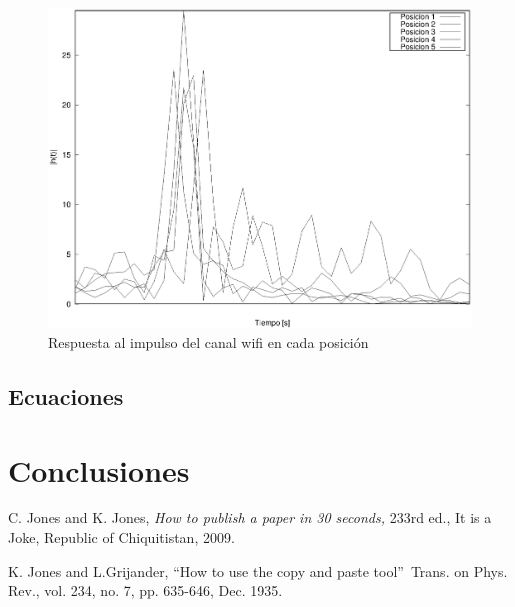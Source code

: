 \documentclass[10pt,conference,a4paper]{IEEEtran}
\begin{document}
\begin{figure}[htb]
    \centering
    \includegraphics[width=\columnwidth]{figuras/respuesta_impulso_wifi.eps}
    \caption{Respuesta al impulso del canal wifi en cada posición}
    \label{fig:impulso_wifi}
\end{figure}
\subsection{Ecuaciones}
\section{Conclusiones}

\begin{thebibliography}{9}                                                                                                %
    C. Jones and K. Jones, \emph{How to publish a paper in 30
seconds,} 233rd ed., It is a Joke, Republic of Chiquitistan, 2009.

    K. Jones and L.Grijander, \textquotedblleft How to use
the copy and paste tool\textquotedblright\ Trans. on Phys. Rev., vol. 234, no.
7, pp. 635-646, Dec. 1935.
\end{thebibliography}
\end{document}

